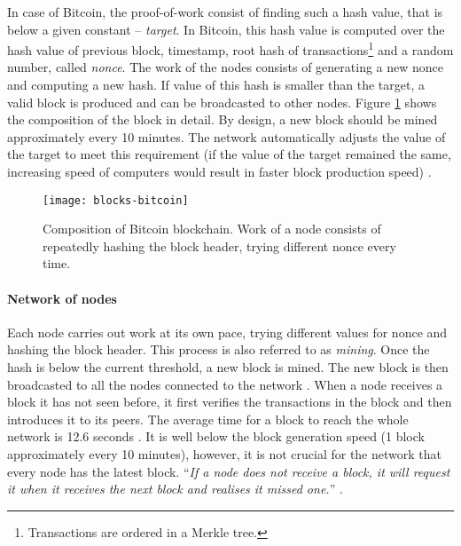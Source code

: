 In case of Bitcoin, the proof-of-work consist of finding such a hash value, that is below a given constant -- \textit{target}. In Bitcoin, this hash value is computed over the hash value of previous block, timestamp\footnotemark, root hash of transactions\footnote{Transactions are ordered in a Merkle tree.} and a random number, called \textit{nonce}. The work of the nodes consists of generating a new nonce and computing a new hash. If value of this hash is smaller than the target, a valid block is produced and can be broadcasted to other nodes. Figure \ref{fig:blocks-bitcoin} shows the composition of the block in detail. By design, a new block should be mined approximately every 10 minutes. The network automatically adjusts the value of the target to meet this requirement (if the value of the target remained the same, increasing speed of computers would result in faster block production speed) \cite{Decker2013InformationNetwork}.
% 
% 
\begin{figure}[ht]
    \centering
    \texttt{[image: blocks-bitcoin]}
    \caption{Composition of Bitcoin blockchain. Work of a node consists of repeatedly hashing the block header, trying different nonce every time.}
    \label{fig:blocks-bitcoin}
\end{figure}
% 
\paragraph{Network of nodes}
Each node carries out work at its own pace, trying different values for nonce and hashing the block header. This process is also referred to as \textit{mining}. Once the hash is below the current threshold, a new block is mined. The new block is then broadcasted to all the nodes connected to the network \cite{NakamotoBitcoin:System}. When a node receives a block it has not seen before, it first verifies the transactions in the block and then introduces it to its peers. The average time for a block to reach the whole network is 12.6 seconds \cite{Decker2013InformationNetwork}. It is well below the block generation speed (1 block approximately every 10 minutes), however, it is not crucial for the network that every node has the latest block. ``\textit{If a node does not receive a block, it will request it when it receives the next block and realises it missed one.}'' \cite{NakamotoBitcoin:System}.
% 
